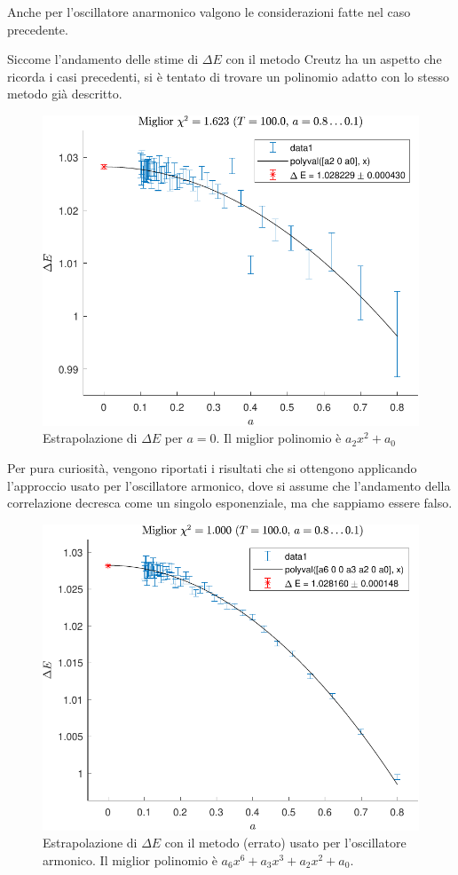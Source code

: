 \documentclass[11pt, a4paper]{article}
\begin{document}
Anche per l'oscillatore anarmonico valgono le considerazioni fatte nel caso precedente.

Siccome l'andamento delle stime di $\Delta E$ con il metodo Creutz ha un aspetto che ricorda i casi precedenti, si è tentato di
trovare un polinomio adatto con lo stesso metodo già descritto.

\begin{figure}[H]
  \centering
  \includegraphics{../plots/qao/final/extrap_DeltaE_creutz_fit-crop.pdf}
  \caption{Estrapolazione di $\Delta E$ per $a=0$. Il miglior polinomio è $a_2 x^2 + a_0$}
\end{figure}


Per pura curiosità, vengono riportati i risultati che si ottengono applicando l'approccio usato per l'oscillatore armonico, dove si assume che l'andamento della correlazione decresca come un singolo esponenziale, ma che sappiamo essere falso.

\begin{figure}[H]
  \centering
  \includegraphics{../plots/qao/final/extrap_DeltaE_fit-crop.pdf}
  \caption{Estrapolazione di $\Delta E$ con il metodo (errato) usato per l'oscillatore armonico. Il miglior polinomio è $a_6 x^6 + a_3 x^3 + a_2 x^2 + a_0$.}
\end{figure}
\end{document}
